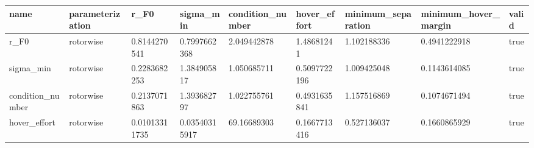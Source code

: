 \begin{tabular}{@{}lllllllll@{}}
\toprule
name & parameterization & r\_F0 & sigma\_min & condition\_number & hover\_effort & minimum\_separation & minimum\_hover\_margin & valid \\
\midrule
r\_F0 & rotorwise & 0.8144270541 & 0.7997662368 & 2.049442878 & 1.48681241 & 1.102188336 & 0.4941222918 & true \\
sigma\_min & rotorwise & 0.2283682253 & 1.384905817 & 1.050685711 & 0.5097722196 & 1.009425048 & 0.1143614085 & true \\
condition\_number & rotorwise & 0.2137071863 & 1.393682797 & 1.022755761 & 0.4931635841 & 1.157516869 & 0.1074671494 & true \\
hover\_effort & rotorwise & 0.01013311735 & 0.03540315917 & 69.16689303 & 0.1667713416 & 0.527136037 & 0.1660865929 & true \\
\bottomrule
\end{tabular}
